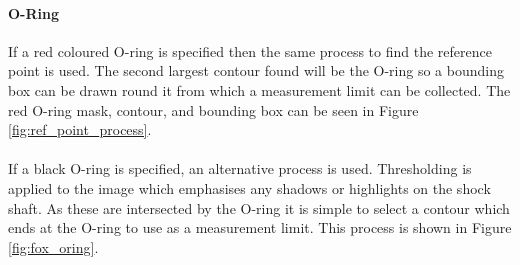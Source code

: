 		\paragraph{O-Ring}
			If a red coloured O-ring is specified then the same process to find the reference point is used. The second largest contour found will be the O-ring so a bounding box can be drawn round it from which a measurement limit can be collected. The red O-ring mask, contour, and bounding box can be seen in Figure \ref{fig:ref_point_process}. 
			\\\\
			If a black O-ring is specified, an alternative process is used. Thresholding is applied to the image which emphasises any shadows or highlights on the shock shaft. As these are intersected by the O-ring it is simple to select a contour which ends at the O-ring to use as a measurement limit. This process is shown in Figure \ref{fig:fox_oring}.
